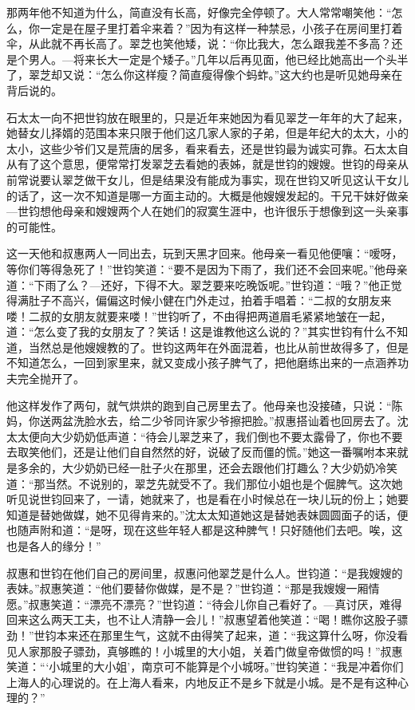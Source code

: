 \par 那两年他不知道为什么，简直没有长高，好像完全停顿了。大人常常嘲笑他：“怎么，你一定是在屋子里打着伞来着？”因为有这样一种禁忌，小孩子在房间里打着伞，从此就不再长高了。翠芝也笑他矮，说：“你比我大，怎么跟我差不多高？还是个男人。—将来长大一定是个矮子。”几年以后再见面，他已经比她高出一个头半了，翠芝却又说：“怎么你这样瘦？简直瘦得像个蚂蚱。”这大约也是听见她母亲在背后说的。
\par 石太太一向不把世钧放在眼里的，只是近年来她因为看见翠芝一年年的大了起来，她替女儿择婿的范围本来只限于他们这几家人家的子弟，但是年纪大的太大，小的太小，这些少爷们又是荒唐的居多，看来看去，还是世钧最为诚实可靠。石太太自从有了这个意思，便常常打发翠芝去看她的表姊，就是世钧的嫂嫂。世钧的母亲从前常说要认翠芝做干女儿，但是结果没有能成为事实，现在世钧又听见这认干女儿的话了，这一次不知道是哪一方面主动的。大概是他嫂嫂发起的。干兄干妹好做亲—世钧想他母亲和嫂嫂两个人在她们的寂寞生涯中，也许很乐于想像到这一头亲事的可能性。
\par 这一天他和叔惠两人一同出去，玩到天黑才回来。他母亲一看见他便嚷：“嗳呀，等你们等得急死了！”世钧笑道：“要不是因为下雨了，我们还不会回来呢。”他母亲道：“下雨了么？—还好，下得不大。翠芝要来吃晚饭呢。”世钧道：“哦？”他正觉得满肚子不高兴，偏偏这时候小健在门外走过，拍着手唱着：“二叔的女朋友来喽！二叔的女朋友就要来喽！”世钧听了，不由得把两道眉毛紧紧地皱在一起，道：“怎么变了我的女朋友了？笑话！这是谁教他这么说的？”其实世钧有什么不知道，当然总是他嫂嫂教的了。世钧这两年在外面混着，也比从前世故得多了，但是不知道怎么，一回到家里来，就又变成小孩子脾气了，把他磨练出来的一点涵养功夫完全抛开了。
\par 他这样发作了两句，就气烘烘的跑到自己房里去了。他母亲也没接碴，只说：“陈妈，你送两盆洗脸水去，给二少爷同许家少爷擦把脸。”叔惠搭讪着也回房去了。沈太太便向大少奶奶低声道：“待会儿翠芝来了，我们倒也不要太露骨了，你也不要去取笑他们，还是让他们自自然然的好，说破了反而僵的慌。”她这一番嘱咐本来就是多余的，大少奶奶已经一肚子火在那里，还会去跟他们打趣么？大少奶奶冷笑道：“那当然。不说别的，翠芝先就受不了。我们那位小姐也是个倔脾气。这次她听见说世钧回来了，一请，她就来了，也是看在小时候总在一块儿玩的份上；她要知道是替她做媒，她不见得肯来的。”沈太太知道她这是替她表妹圆圆面子的话，便也随声附和道：“是呀，现在这些年轻人都是这种脾气！只好随他们去吧。唉，这也是各人的缘分！”
\par 叔惠和世钧在他们自己的房间里，叔惠问他翠芝是什么人。世钧道：“是我嫂嫂的表妹。”叔惠笑道：“他们要替你做媒，是不是？”世钧道：“那是我嫂嫂一厢情愿。”叔惠笑道：“漂亮不漂亮？”世钧道：“待会儿你自己看好了。—真讨厌，难得回来这么两天工夫，也不让人清静一会儿！”叔惠望着他笑道：“喝！瞧你这股子骠劲！”世钧本来还在那里生气，这就不由得笑了起来，道：“我这算什么呀，你没看见人家那股子骠劲，真够瞧的！小城里的大小姐，关着门做皇帝做惯的吗！”叔惠笑道：“‘小城里的大小姐’，南京可不能算是个小城呀。”世钧笑道：“我是冲着你们上海人的心理说的。在上海人看来，内地反正不是乡下就是小城。是不是有这种心理的？”
